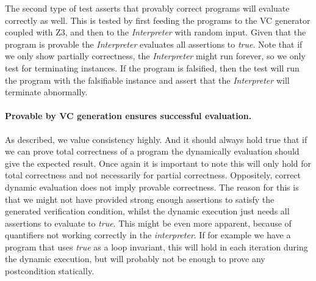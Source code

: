 The second type of test asserts that provably correct programs will evaluate correctly as well.
This is tested by first feeding the programs to the VC generator coupled with Z3, and then to the \textit{Interpreter} with random input.
Given that the program is provable the \textit{Interpreter} evaluates all assertions to \textit{true}. Note that if we only show partially correctness, the \textit{Interpreter} might run forever, so we only test for terminating instances.
If the program is falsified, then the test will run the program with the falsifiable instance and assert that the \textit{Interpreter} will terminate abnormally.

\paragraph{Provable by VC generation ensures successful evaluation.}

As described, we value consistency highly. And it should always hold true that if we can prove total correctness of a program the dynamically evaluation should give the expected result. Once again it is important to note this will only hold for total correctness and not necessarily for partial correctness.
Oppositely, correct dynamic evaluation does not imply provable correctness.
The reason for this is that we might not have provided strong enough assertions to satisfy the generated verification condition, whilst the dynamic execution just needs all assertions to evaluate to \textit{true}. This might be even more apparent, because of quantifiers not working correctly in the \textit{interpreter}.
If for example we have a program that uses \textit{true} as a loop invariant, this will hold in each iteration during the dynamic execution, but will probably not be enough to prove any postcondition statically.

